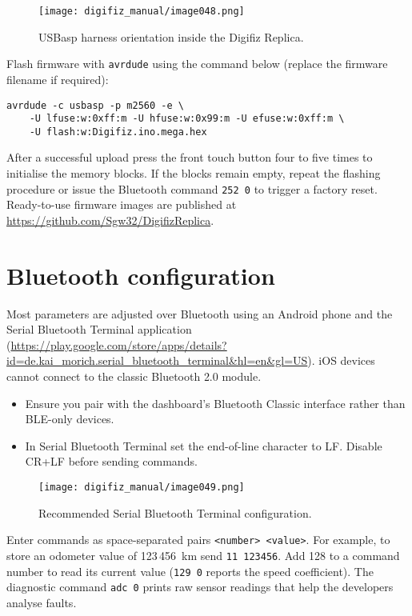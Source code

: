 \begin{figure}[htbp]
    \centering
    \texttt{[image: digifiz\_manual/image048.png]}
    \caption{USBasp harness orientation inside the Digifiz Replica.}
    \label{fig:usbasp-cable}
\end{figure}

Flash firmware with \texttt{avrdude} using the command below (replace the firmware filename if required):

\begin{verbatim}
avrdude -c usbasp -p m2560 -e \
    -U lfuse:w:0xff:m -U hfuse:w:0x99:m -U efuse:w:0xff:m \
    -U flash:w:Digifiz.ino.mega.hex
\end{verbatim}

After a successful upload press the front touch button four to five times to initialise the memory blocks. If the blocks remain empty, repeat the flashing procedure or issue the Bluetooth command \verb|252 0| to trigger a factory reset. Ready-to-use firmware images are published at \url{https://github.com/Sgw32/DigifizReplica}.

\section{Bluetooth configuration}
Most parameters are adjusted over Bluetooth using an Android phone and the Serial Bluetooth Terminal application (\url{https://play.google.com/store/apps/details?id=de.kai_morich.serial_bluetooth_terminal&hl=en&gl=US}). iOS devices cannot connect to the classic Bluetooth 2.0 module.

\begin{itemize}
    \item Ensure you pair with the dashboard's Bluetooth Classic interface rather than BLE-only devices.
    \item In Serial Bluetooth Terminal set the end-of-line character to LF. Disable CR+LF before sending commands.
\end{itemize}

\begin{figure}[htbp]
    \centering
    \texttt{[image: digifiz\_manual/image049.png]}
    \caption{Recommended Serial Bluetooth Terminal configuration.}
    \label{fig:sbt-settings}
\end{figure}

Enter commands as space-separated pairs \verb|<number> <value>|. For example, to store an odometer value of 123\,456~km send \verb|11 123456|. Add 128 to a command number to read its current value (\verb|129 0| reports the speed coefficient). The diagnostic command \verb|adc 0| prints raw sensor readings that help the developers analyse faults.


